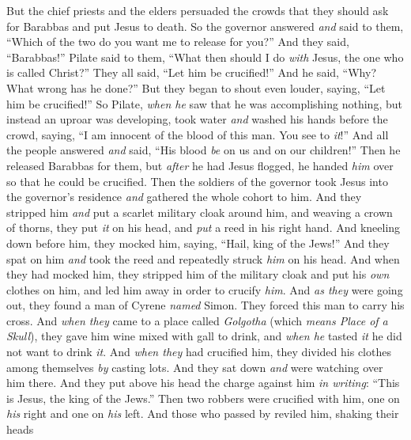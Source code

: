 \begin{biblechapter}
\verse But the chief priests and the elders persuaded the crowds that they should ask for Barabbas and put Jesus to death.
\verse So the governor answered \textit{and} said to them, “Which of the two do you want me to release for you?” And they said, “Barabbas!”
\verse Pilate said to them, “What then should I do \textit{with} Jesus, the one who is called Christ?” They all said, “Let him be crucified!”
\verse And he said, “Why? What wrong has he done?” But they began to shout even louder, saying, “Let him be crucified!”
\verse So Pilate, \textit{when he} saw that he was accomplishing nothing, but instead an uproar was developing, took water \textit{and} washed his hands before the crowd, saying, “I am innocent of the blood of this man. You see to \textit{it}!”
\verse And all the people answered \textit{and} said, “His blood \textit{be} on us and on our children!”
\verse Then he released Barabbas for them, but \textit{after} he had Jesus flogged, he handed \textit{him} over so that he could be crucified.
 Then the soldiers of the governor took Jesus into the governor’s residence \textit{and} gathered the whole cohort to him.
\verse And they stripped him \textit{and} put a scarlet military cloak around him,
\verse and weaving a crown of thorns, they put \textit{it} on his head, and \textit{put} a reed in his right hand. And kneeling down before him, they mocked him, saying, “Hail, king of the Jews!”
\verse And they spat on him \textit{and} took the reed and repeatedly struck \textit{him} on his head.
\verse And when they had mocked him, they stripped him of the military cloak and put his \textit{own} clothes on him, and led him away in order to crucify \textit{him}.
 And \textit{as they} were going out, they found a man of Cyrene \textit{named} Simon. They forced this man to carry his cross.
\verse And \textit{when they} came to a place called \textit{Golgotha} (which \textit{means Place of a Skull}),
\verse they gave him wine mixed with gall to drink, and \textit{when he} tasted \textit{it} he did not want to drink \textit{it}.
\verse And \textit{when they} had crucified him, they divided his clothes among themselves \textit{by} casting lots.
\verse And they sat down \textit{and} were watching over him there.
\verse And they put above his head the charge against him \textit{in writing}: “This is Jesus, the king of the Jews.”
\verse Then two robbers were crucified with him, one on \textit{his} right and one on \textit{his} left.
\verse And those who passed by reviled him, shaking their heads

\end{biblechapter}
